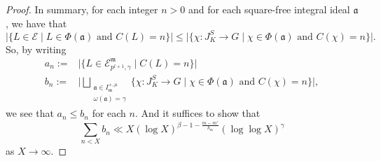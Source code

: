 \documentclass{amsart}
\numberwithin{equation}{section}
\theoremstyle{plain}
\theoremstyle{definition}
\theoremstyle{remark}
\begin{document}
\begin{proof}
	In summary, for each integer $n>0$ and for each square-free integral ideal $\mathfrak{a}$, we have that
	\begin{equation*}
        \lvert\{L\in\mathcal{E}\mid L\in\Phi(\mathfrak{a})\text{ and }C(L)=n\}\rvert
		\leq
        \lvert\{\chi:J_K^S\to G\mid\chi\in\Phi(\mathfrak{a})\text{ and }C(\chi)=n\}\rvert.
	\end{equation*}
	So, by writing
	\begin{equation*}
        \begin{aligned}
            a_n:=&\lvert\{L\in\mathcal{E}_{p^{l+1},\gamma}^{\mathfrak{m}}\mid C(L)=n\}\rvert
            \\
            b_n:=&\Biggl\lvert
        \bigsqcup_{
			\substack{
				\mathfrak{a}\in I^{+,\mu}_{\mathfrak{m}}\\
				\omega(\mathfrak{a})=\gamma
			}
		}\{\chi:J_K^S\to G\mid \chi\in\Phi(\mathfrak{a})\text{ and }C(\chi)=n\}
        \Biggr\rvert,	
        \end{aligned}
	\end{equation*}
	we see that $a_n\leq b_n$ for each $n$.
	And it suffices to show that
	\begin{equation*}
		\sum_{n<X}b_n\ll X(\log X)^{\beta-1-\frac{m-m'}{h_{\mathfrak{m}}}}(\log\log X)^{\gamma}
	\end{equation*}
	as $X\to\infty$.
	

\end{proof}
\end{document}
